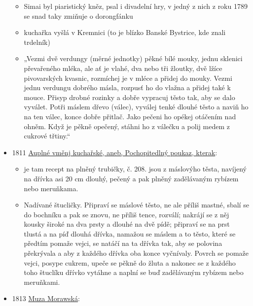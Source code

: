 \begin{itemize}
  \begin{itemize}
  \tightlist
  \item
    Simai byl piaristický kněz, psal i divadelní hry, v jedný z nich z
    roku 1789 se snad taky zmiňuje o dorongfánku
  \item
    kuchařka vyšlá v Kremnici (to je blízko Banské Bystrice, kde znali
    trdelník)
  \item
    „Vezmi dvě verdungy (měrné jednotky) pěkné bílé mouky, jednu
    sklenici převařeného mléka, ale ať je vlahé, dva nebo tři žloutky,
    dvě lžíce pivovarských kvasnic, rozmíchej je v mléce a přidej do
    mouky. Vezmi jednu verdungu dobrého másla, rozpusť ho do vlažna a
    přidej také k mouce. Přisyp drobné rozinky a dobře vypracuj těsto
    tak, aby se dalo vyválet. Potři máslem dřevo (válec), vyválej tenké
    dlouhé těsto a naviň ho na ten válec, konce dobře přitlač. Jako
    pečeni ho opékej otáčením nad ohněm. Když je pěkně opečený, stáhni
    ho z válečku a polij medem z cukrové třtiny.``
  \end{itemize}
\item
  1811
  \href{https://ceskadigitalniknihovna.cz/view/uuid:e11769d0-4c42-11e7-aac4-005056827e51?page=uuid\%3A628a69f0-6565-11e7-94b3-005056825209&source=mzk}{Auplné
  vměnj kuchařské, aneb, Pochopitedlný poukaz, kterak}:

  \begin{itemize}
  \tightlist
  \item
    je tam recept na plněný trubičky, č. 208. jsou z máslovýho těsta,
    navíjený na dřívka asi 20 cm dlouhý, pečený a pak plněný zadělávaným
    rybízem nebo meruňkama.
  \item
    Nadívané štucličky. Připraví se máslové těsto, ne ale příliš mastné,
    sbalí se do bochníku a pak se znovu, ne příliš tence, rozválí;
    nakrájí se z něj kousky široké na dva prsty a dlouhé na dvě pídě;
    připraví se na prst tlustá a na píď dlouhá dřívka, namažou se máslem
    a to těsto, které se předtím pomaže vejci, se natáčí na ta dřívka
    tak, aby se polovina překrývala a aby z každého dřívka oba konce
    vyčnívaly. Povrch se pomaže vejci, posype cukrem, upeče se pěkně do
    žluta a nakonec se z každého toho štuclíku dřívko vytáhne a naplní
    se buď zadělávaným rybízem nebo meruňkami.
  \end{itemize}
\item
  1813
  \href{https://ndk.cz/view/uuid:c0247bb0-d3b5-11dc-b9b7-000d606f5dc6?page=uuid:f986d11e-aa9e-41c6-b183-52fcf3fc3f80}{Muza
  Morawská}:


\end{itemize}
